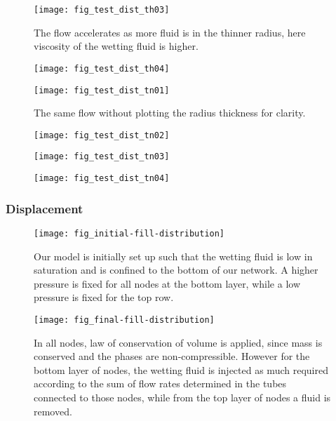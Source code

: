 		\begin{figure}[H]
			\centering
			\texttt{[image: fig\_test\_dist\_th03]}
			\caption{The flow accelerates as more fluid is in the thinner radius, here viscosity of the wetting fluid is higher.}
		\end{figure}

		\begin{figure}[H]
			\centering
			\texttt{[image: fig\_test\_dist\_th04]}
			\caption{}
		\end{figure}
		
		\begin{figure}[H]
			\centering
			\texttt{[image: fig\_test\_dist\_tn01]}
			\caption{The same flow without plotting the radius thickness for clarity.}
		\end{figure}

		\begin{figure}[H]
			\centering
			\texttt{[image: fig\_test\_dist\_tn02]}
			\caption{}
			
		\end{figure}
		
		\begin{figure}[H]
			\centering
			\texttt{[image: fig\_test\_dist\_tn03]}
			\caption{}
		\end{figure}

		\begin{figure}[H]
			\centering
			\texttt{[image: fig\_test\_dist\_tn04]}
			\caption{}
		\end{figure}
		
		
	\subsubsection{Displacement}
		\begin{figure}[H]
			\centering
			\texttt{[image: fig\_initial-fill-distribution]}
			\caption{Our model is initially set up such that the wetting fluid is low in saturation and is confined to the bottom of our network. A higher pressure is fixed for all nodes at the bottom layer, while a  low pressure is fixed for the top row.}
			\label{fig_plot-sat-vs-time-disp-one}
		\end{figure}

		\begin{figure}[H]
			\centering
			\texttt{[image: fig\_final-fill-distribution]}
			\caption{In all nodes, law of conservation of volume is applied, since mass is conserved and the phases are non-compressible. However for the bottom layer of nodes, the wetting fluid is injected as much required according to the sum of flow rates determined in the tubes connected to those nodes, while from the top layer of nodes a fluid is removed.}
			\label{fig_plot-sat-vs-time-disp-two}
		\end{figure}

